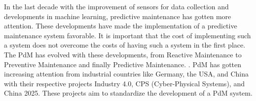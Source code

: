 In the last decade with the improvement of sensors for data collection and developments in machine learning, predictive maintenance has gotten more attention. These developments have made the
implementation of a predictive maintenance system favorable. It is important that the cost of implementing such a system does not overcome the costs of having such a system in the first place. The PdM has evolved with these developments, from Reactive Maintenance to Preventive Maintenance and finally Predictive Maintenance. \cite{DBLP:journals/corr/abs-1912-07383} . PdM has gotten  increasing attention from industrial countries like Germany, the USA, and China with their respective projects Industry 4.0, CPS (Cyber-Physical Systems), and China 2025. These projects aim to standardize the development of a PdM system. \cite{DBLP:journals/sj/ZhangYW19}

